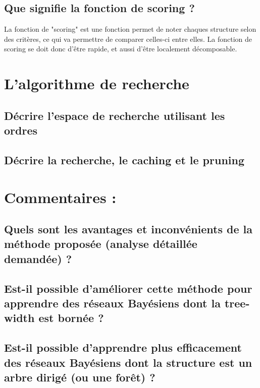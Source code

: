 \documentclass[french,a4paper]{article}
\begin{document}
\subsection{Que signifie la fonction de scoring ?}
La fonction de "scoring" est une fonction permet de noter chaques structure selon des critères, ce qui va permettre de comparer celles-ci entre elles.
La fonction de scoring se doit donc d'être rapide, et aussi d'être localement décomposable.

\section{L'algorithme de recherche}
\subsection{Décrire l'espace de recherche utilisant les ordres}


\subsection{Décrire la recherche, le caching et le pruning}

\section{Commentaires :}
\subsection{Quels sont les avantages et inconvénients de la méthode proposée (analyse détaillée demandée) ?}
\subsection{Est-il possible d'améliorer cette méthode pour apprendre des réseaux Bayésiens dont la tree-width est bornée ?}
\subsection{Est-il possible d'apprendre plus efficacement des réseaux Bayésiens dont la structure est un arbre dirigé (ou une forêt) ?}
\end{document}
